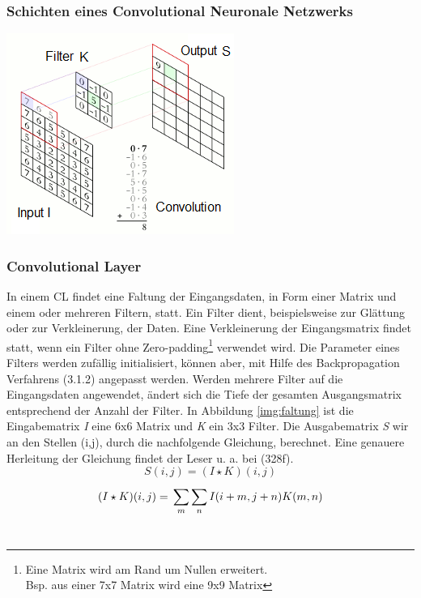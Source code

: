 \documentclass[twosided,a4,10pt]{article}
\begin{document}
\begin{multicols}{2}
		\subsubsection{Schichten eines Convolutional Neuronale Netzwerks}
		\begin{minipage}{0.45\textwidth}
			\centering
			\includegraphics{img/faltung2.png}
			\label{img:faltung}
		\end{minipage}\newline
		\subsubsection*{Convolutional Layer}
		In einem CL findet eine Faltung der Eingangsdaten, in Form einer Matrix und einem oder mehreren Filtern, statt. Ein Filter dient, beispielsweise zur Glättung oder zur Verkleinerung, der Daten. Eine Verkleinerung der Eingangsmatrix findet statt, wenn ein Filter ohne Zero-padding\footnote[11]{Eine Matrix wird am Rand um Nullen erweitert.\\ Bsp. aus einer 7x7 Matrix wird eine 9x9 Matrix} verwendet wird. Die Parameter eines Filters werden zufällig initialisiert, können aber, mit Hilfe des Backpropagation Verfahrens (3.1.2) angepasst werden. Werden mehrere Filter auf die Eingangsdaten angewendet, ändert sich die Tiefe der gesamten Ausgangsmatrix entsprechend der Anzahl der Filter. \cite{karpathy}\newline
		In Abbildung \ref{img:faltung} ist die Eingabematrix \textit{I} eine 6x6 Matrix und \textit{K} ein 3x3 Filter. Die Ausgabematrix \textit{S} wir an den Stellen (i,j), durch die nachfolgende Gleichung, berechnet. Eine genauere Herleitung der Gleichung findet der Leser u. a. bei \cite{goodfellow}(328f).\newline\\	
		\begin{equation*}
		S(i,j) =(I \star K)(i,j)
		\end{equation*}
		\begin{equation*}
		(I \star K)(i,j) =\newline\sum_{m}^{}\sum_{n}^{}I(i+m,j+n)K(m,n)
		\end{equation*}\newline\\

\end{multicols}
\end{document}

